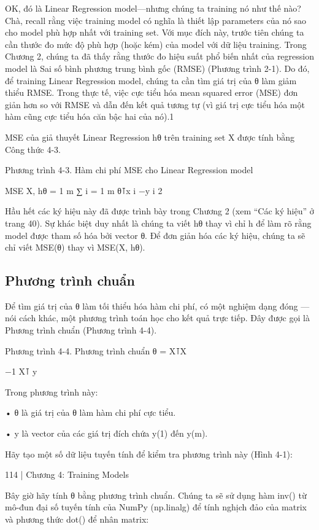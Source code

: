 OK, đó là Linear Regression model—nhưng chúng ta training nó như thế nào? Chà, recall rằng việc training model có nghĩa là thiết lập parameters của nó sao cho model phù hợp nhất với training set. Với mục đích này, trước tiên chúng ta cần thước đo mức độ phù hợp (hoặc kém) của model với dữ liệu training. Trong Chương 2, chúng ta đã thấy rằng thước đo hiệu suất phổ biến nhất của regression model là Sai số bình phương trung bình gốc (RMSE) (Phương trình 2-1). Do đó, để training Linear Regression model, chúng ta cần tìm giá trị của θ làm giảm thiểu RMSE. Trong thực tế, việc cực tiểu hóa mean squared error (MSE) đơn giản hơn so với RMSE và dẫn đến kết quả tương tự (vì giá trị cực tiểu hóa một hàm cũng cực tiểu hóa căn bậc hai của nó).1

MSE của giả thuyết Linear Regression hθ trên training set X được tính bằng Công thức 4-3.

Phương trình 4-3. Hàm chi phí MSE cho Linear Regression model

MSE X, ​​hθ = 1 m ∑ i = 1 m θ⊺x i −y i 2

Hầu hết các ký hiệu này đã được trình bày trong Chương 2 (xem “Các ký hiệu” ở trang 40). Sự khác biệt duy nhất là chúng ta viết hθ thay vì chỉ h để làm rõ rằng model được tham số hóa bởi vector θ. Để đơn giản hóa các ký hiệu, chúng ta sẽ chỉ viết MSE(θ) thay vì MSE(X, hθ).

\subsection{Phương trình chuẩn}

Để tìm giá trị của θ làm tối thiểu hóa hàm chi phí, có một nghiệm dạng đóng — nói cách khác, một phương trình toán học cho kết quả trực tiếp. Đây được gọi là Phương trình chuẩn (Phương trình 4-4).

Phương trình 4-4. Phương trình chuẩn θ = X⊺X

−1 X⊺ y

Trong phương trình này:

• θ là giá trị của θ làm hàm chi phí cực tiểu.

• y là vector của các giá trị đích chứa y(1) đến y(m).

Hãy tạo một số dữ liệu tuyến tính để kiểm tra phương trình này (Hình 4-1):

114 | Chương 4: Training Models

Bây giờ hãy tính θ bằng phương trình chuẩn. Chúng ta sẽ sử dụng hàm inv() từ mô-đun đại số tuyến tính của NumPy (np.linalg) để tính nghịch đảo của matrix và phương thức dot() để nhân matrix:

